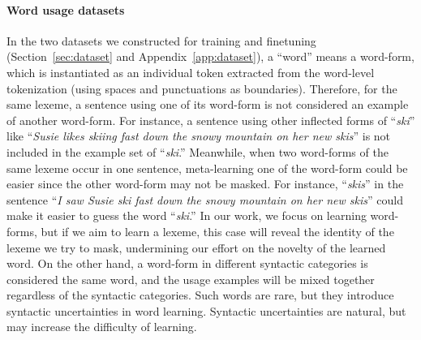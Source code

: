 \documentclass{article}
\begin{document}
\paragraph{Word usage datasets}
In the two datasets we constructed for training and finetuning (Section~\ref{sec:dataset} and Appendix~\ref{app:dataset}), a ``word'' means a word-form, which is instantiated as an individual token extracted from the word-level tokenization (using spaces and punctuations as boundaries).
Therefore, for the same lexeme, a sentence using one of its word-form is not considered an example of another word-form. For instance, a sentence using other inflected forms of ``\emph{ski}'' like ``\emph{Susie likes skiing fast down the snowy mountain on her new skis}'' is not included in the example set of ``\emph{ski}.''
Meanwhile, when two word-forms of the same lexeme occur in one sentence, meta-learning one of the word-form could be easier since the other word-form may not be masked. For instance, ``\emph{skis}'' in the sentence ``\emph{I saw Susie ski fast down the snowy mountain on her new skis}'' could make it easier to guess the word ``\emph{ski}.''
In our work, we focus on learning word-forms, but if we aim to learn a lexeme, this case will reveal the identity of the lexeme we try to mask, undermining our effort on the novelty of the learned word.
On the other hand, a word-form in different syntactic categories is considered the same word, and the usage examples will be mixed together regardless of the syntactic categories. Such words are rare, but they introduce syntactic uncertainties in word learning. Syntactic uncertainties are natural, but may increase the difficulty of learning.
\end{document}
